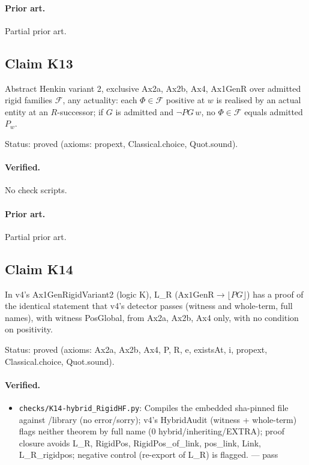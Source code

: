 \documentclass{article}
\begin{document}
\paragraph{Prior art.} Partial prior art.

\subsection*{Claim K13}

Abstract Henkin variant 2, exclusive Ax2a, Ax2b, Ax4, Ax1GenR over admitted rigid families $\mathcal F$, any actuality: each $\Phi\in\mathcal F$ positive at $w$ is realised by an actual entity at an $R$-successor; if $G$ is admitted and $\neg PG\,w$, no $\Phi\in\mathcal F$ equals admitted $P_w$.

Status: proved (axioms: propext, Classical.choice, Quot.sound).

\paragraph{Verified.}
No check scripts.

\paragraph{Prior art.} Partial prior art.

\subsection*{Claim K14}

In v4's Ax1GenRigidVariant2 (logic K), L\_R ($\mathrm{Ax1GenR}\to\lfloor PG\rfloor$) has a proof of the identical statement that v4's detector passes (witness and whole-term, full names), with witness PosGlobal, from Ax2a, Ax2b, Ax4 only, with no condition on positivity.

Status: proved (axioms: Ax2a, Ax2b, Ax4, P, R, e, existsAt, i, propext, Classical.choice, Quot.sound).

\paragraph{Verified.}
\begin{itemize}
\item \texttt{checks/K14-hybrid\_RigidHF.py}: Compiles the embedded sha-pinned file against /library (no error/sorry); v4's HybridAudit (witness + whole-term) flags neither theorem by full name (0 hybrid/inheriting/EXTRA); proof closure avoids L\_R, RigidPos, RigidPos\_of\_link, pos\_link, Link, L\_R\_rigidpos; negative control (re-export of L\_R) is flagged. --- pass
\end{itemize}
\end{document}
